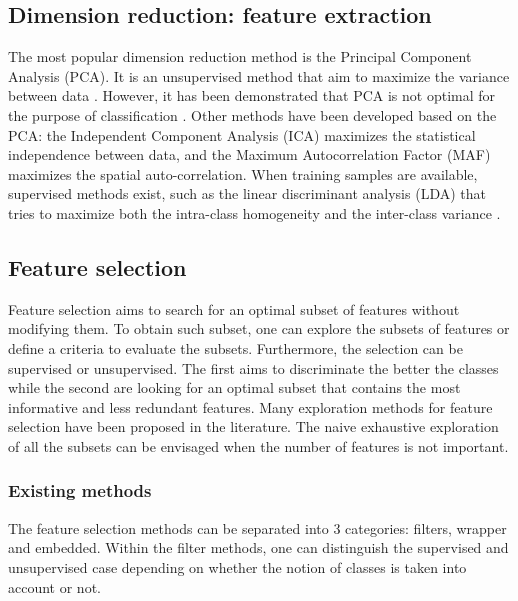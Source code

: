 \subsection{Dimension reduction: feature extraction}
The most popular dimension reduction method is the Principal Component Analysis (PCA). It is an unsupervised method that aim to maximize the variance between data \citep{jolliffe2011principal}. However, it has been demonstrated that PCA is not optimal for the purpose of classification \citep{cheriyadat2003principal}. Other methods have been developed based on the PCA: the Independent Component Analysis (ICA) \citep{jutten1991blind} maximizes the statistical independence between data, and the Maximum Autocorrelation Factor (MAF) \citep{larsen2002decomposition} maximizes the spatial auto-correlation. When training samples are available, supervised methods exist, such as the linear discriminant analysis (LDA) that tries to maximize both the intra-class homogeneity and the inter-class variance \citep{fisher1936use, lebart1997multidimensional}.

\subsection{Feature selection}
Feature selection aims to search for an optimal subset of features without modifying them. To obtain such subset, one can explore the subsets of features or define a criteria to evaluate the subsets. Furthermore, the selection can be supervised or unsupervised. The first aims to discriminate the better the classes while the second are looking for an optimal subset that contains the most informative and less redundant features.
Many exploration methods for feature selection have been proposed in the literature. The naive exhaustive exploration of all the subsets can be envisaged when the number of features is not important. 

\subsubsection{Existing methods}
The feature selection methods can be separated into 3 categories: filters, wrapper and embedded. Within the filter methods, one can distinguish the supervised and unsupervised case depending on whether the notion of classes is taken into account or not.


